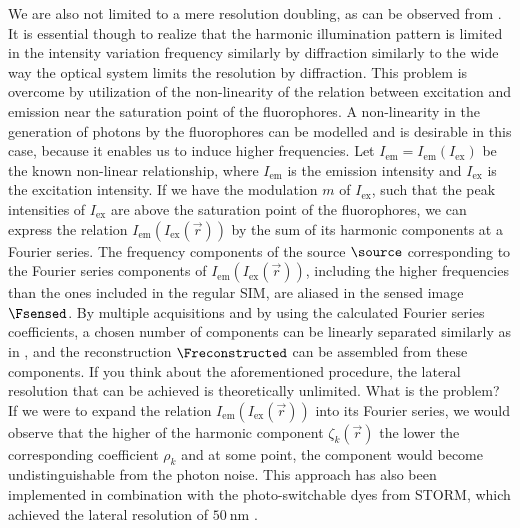 We are also not limited to a mere resolution doubling, as can be observed from  
    .
It is essential though to realize  that the harmonic illumination pattern is limited in the intensity variation 
    frequency similarly by diffraction similarly to the wide way the optical system limits the resolution by
    diffraction.
This problem is overcome by utilization of the non-linearity of the relation between excitation and emission near the
    saturation point of the fluorophores.
A non-linearity in the generation of photons by the fluorophores can be modelled and is desirable in this case, because
    it enables us to induce higher frequencies.
Let \(I_{\text{em}} = I_{\text{em}}(I_{\text{ex}})\) be the known non-linear relationship, where \(I_{\text{em}}\) is 
    the emission intensity and \(I_{\text{ex}}\) is the excitation intensity.
If we have the modulation \(m\) of \(I_{\text{ex}}\), such that the peak intensities of \(I_{\text{ex}}\) are above the
    saturation point of the fluorophores, we can express the relation \(I_{\text{em}}(I_{\text{ex}}(\vec{r}))\) by the
    sum of its harmonic components at a Fourier series.
The frequency components of the source \(\source\) corresponding to the Fourier series components of 
    \(I_{\text{em}}(I_{\text{ex}}(\vec{r}))\), including the higher frequencies than the ones included in the regular \ac{SIM}, are 
    aliased in the sensed image \(\Fsensed\). 
By multiple acquisitions and by using the calculated Fourier series coefficients, a chosen number of components can be 
    linearly separated similarly as in , and the reconstruction \(\Freconstructed\) can be
    assembled from these components.
If you think about the aforementioned procedure, the lateral resolution that can be achieved is theoretically unlimited.
What is the problem?
If we were to expand the relation \(I_{\text{em}}(I_{\text{ex}}(\vec{r}))\) into its Fourier series, we would observe that the higher
    of the harmonic component \(\zeta_k(\vec{r})\) the lower the corresponding coefficient \(\rho_k\) and at some point, the 
    component would become undistinguishable from the photon noise.
This approach has also been implemented in combination with the photo-switchable dyes from \acs{STORM}, which achieved
    the lateral resolution of \(\qty{50}{\nano\meter}\) .


